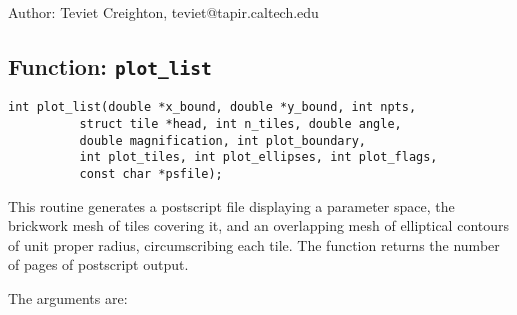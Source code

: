 \begin{description}
\item{Author:}
  Teviet Creighton, teviet@tapir.caltech.edu
\end{description}


\clearpage
\subsection{Function: {\tt plot\_list}}
\label{ss:plot_list}

\begin{verbatim}
int plot_list(double *x_bound, double *y_bound, int npts,
	      struct tile *head, int n_tiles, double angle,
	      double magnification, int plot_boundary,
	      int plot_tiles, int plot_ellipses, int plot_flags,
	      const char *psfile);
\end{verbatim}

This routine generates a postscript file displaying a parameter space,
the brickwork mesh of tiles covering it, and an overlapping mesh of
elliptical contours of unit proper radius, circumscribing each tile.
The function returns the number of pages of postscript output.

The arguments are:


